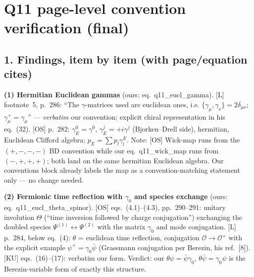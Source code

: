 \section*{Q11 page-level convention verification (final)}

\subsection*{1. Findings, item by item (with page/equation cites)}

\textbf{(1) Hermitian Euclidean gammas} (ours: eq.~q11\_eucl\_gamma).
[L] footnote~5, p.~286: ``The $\gamma$-matrices used are euclidean
ones, i.e. $\{\gamma_\mu,\gamma_\nu\}=2\delta_{\mu\nu}$;
$\gamma_\mu^+=\gamma_\mu$'' --- \emph{verbatim} our convention;
explicit chiral representation in his eq.~(32).
[OS] p.~282: $\gamma_E^0=\gamma^0$, $\gamma_E^j=+i\gamma^j$
(Bjorken--Drell side), hermitian, Euclidean Clifford algebra;
$p_E=\sum p_l\gamma_l^E$.
Note: [OS] Wick-map runs from the $(+,-,-,-)$ BD convention while
our eq.~q11\_wick\_map runs from $(-,+,+,+)$; both land on the same
hermitian Euclidean algebra. Our conventions block already labels
the map as a convention-matching statement only --- no change
needed.

\textbf{(2) Fermionic time reflection with $\gamma_0$ and species
exchange} (ours: eq.~q11\_eucl\_theta\_spinor).
[OS] eqs.~(4.1)--(4.3), pp.~290--291: unitary involution $\Theta$
(``time inversion followed by charge conjugation'') exchanging the
doubled species $\Psi^{(1)}\!\leftrightarrow\!\Psi^{(2)}$ with the
matrix $\gamma_0$ and mode conjugation.
[L] p.~284, below eq.~(4): $\theta$ = euclidean time reflection,
conjugation $\mathcal O\to\mathcal O^+$ with the explicit example
$\psi^+=\gamma_0\bar\psi$ (Grassmann conjugation per Berezin, his
ref.~[8]).
[KU] eqs.~(16)--(17): verbatim our form.
Verdict: our $\theta\psi=\bar\psi\gamma_0$,
$\theta\bar\psi=\gamma_0\psi$ is the Berezin-variable form of
exactly this structure.

